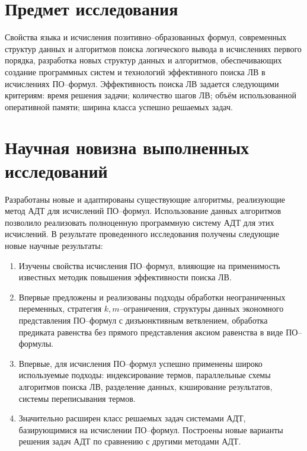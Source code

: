 \section*{Предмет исследования}
Свойства языка и исчисления позитивно--образованных формул, современных структур данных и алгоритмов поиска логического вывода в исчислениях первого порядка, разработка новых структур данных и алгоритмов, обеспечивающих создание программных систем и технологий эффективного поиска ЛВ в исчислениях ПО--формул. Эффективность поиска ЛВ задается следующими критериям: время решения задачи; количество шагов ЛВ; объём использованной оперативной памяти; ширина класса успешно решаемых задач.

\section*{Научная новизна выполненных исследований}
Разработаны новые и адаптированы существующие алгоритмы, реализующие метод АДТ для исчислений ПО--формул. Использование данных алгоритмов позволило реализовать полноценную программную систему АДТ для этих исчислений. В результате проведенного исследования получены следующие новые научные результаты:
\begin{enumerate}
\item Изучены свойства исчисления ПО--формул, влияющие на применимость известных методик повышения эффективности поиска ЛВ.
\item Впервые предложены и реализованы подходы обработки неограниченных переменных, стратегия $k,m$--ограничения, структуры данных экономного представления ПО--формул с дизъюнктивным ветвлением, обработка предиката равенства без прямого представления аксиом равенства в виде ПО--формулы.
\item Впервые, для исчисления ПО--формул успешно применены широко используемые подходы: индексирование термов, параллельные схемы алгоритмов поиска ЛВ, разделение данных, кэширование результатов, системы переписывания термов.
\item Значительно расширен класс решаемых задач системами АДТ, базирующимися на исчислении ПО--формул. Построены новые варианты решения задач АДТ по сравнению с другими методами АДТ.
\end{enumerate}




